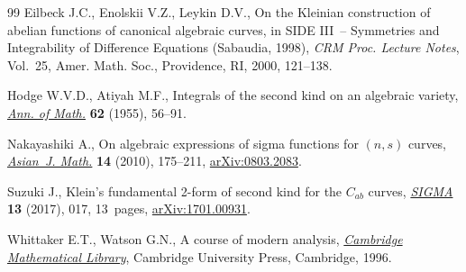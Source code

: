\documentclass[pdftex]{sigma}
\numberwithin{equation}{section}
\begin{document}
\begin{thebibliography}{99}
Eilbeck J.C., Enolskii V.Z., Leykin D.V., On the {K}leinian construction of
 abelian functions of canonical algebraic curves, in S{IDE} {III}~--
 Symmetries and Integrability of Difference Equations ({S}abaudia, 1998),
 \textit{CRM Proc. Lecture Notes}, Vol.~25, Amer. Math. Soc., Providence, RI,
 2000, 121--138.

Hodge W.V.D., Atiyah M.F., Integrals of the second kind on an algebraic
 variety, \href{https://doi.org/10.2307/2007100}{\textit{Ann. of Math.}} \textbf{62} (1955), 56--91.

Nakayashiki A., On algebraic expressions of sigma functions for {$(n,s)$}
 curves, \href{https://doi.org/10.4310/AJM.2010.v14.n2.a2}{\textit{Asian~J. Math.}} \textbf{14} (2010), 175--211,
 \href{https://arxiv.org/abs/0803.2083}{arXiv:0803.2083}.

Suzuki J., Klein's fundamental 2-form of second kind for the {$C_{ab}$} curves,
 \href{https://doi.org/10.3842/SIGMA.2017.017}{\textit{SIGMA}} \textbf{13} (2017), 017, 13~pages, \href{https://arxiv.org/abs/1701.00931}{arXiv:1701.00931}.

Whittaker E.T., Watson G.N., A course of modern analysis, \href{https://doi.org/10.1017/CBO9780511608759}{\textit{Cambridge
 Mathematical Library}}, Cambridge University Press, Cambridge, 1996.

\end{thebibliography}\LastPageEnding
\end{document}
